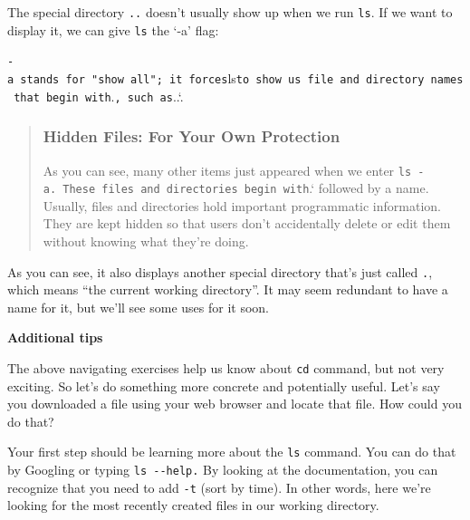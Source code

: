 \documentclass[
  letterpaper,
  DIV=11,
  numbers=noendperiod]{scrreprt}
\newenvironment{Shaded}{\begin{snugshade}}{\end{snugshade}}
\newcommand{\AttributeTok}[1]{\textcolor[rgb]{0.40,0.45,0.13}{#1}}
\newcommand{\BuiltInTok}[1]{\textcolor[rgb]{0.00,0.23,0.31}{#1}}
\newcommand{\ExtensionTok}[1]{\textcolor[rgb]{0.00,0.23,0.31}{#1}}
\newcommand{\NormalTok}[1]{\textcolor[rgb]{0.00,0.23,0.31}{#1}}
\begin{document}
The special directory \texttt{..} doesn't usually show up when we run
\texttt{ls}. If we want to display it, we can give \texttt{ls} the `-a'
flag:

\begin{Shaded}
\end{Shaded}

\texttt{-a\textquotesingle{}\ stands\ for\ "show\ all";\ it\ forces}ls\texttt{to\ show\ us\ file\ and\ directory\ names\ that\ begin\ with}.\texttt{,\ such\ as}..`.

\begin{quote}
\hypertarget{hidden-files-for-your-own-protection}{%
\subsubsection*{Hidden Files: For Your Own
Protection}\label{hidden-files-for-your-own-protection}}

As you can see, many other items just appeared when we enter
\texttt{ls\ -a\textquotesingle{}.\ These\ files\ and\ directories\ begin\ with}.`
followed by a name. Usually, files and directories hold important
programmatic information. They are kept hidden so that users don't
accidentally delete or edit them without knowing what they're doing.
\end{quote}

As you can see, it also displays another special directory that's just
called \texttt{.}, which means ``the current working directory''. It may
seem redundant to have a name for it, but we'll see some uses for it
soon.

\textbf{Additional tips}

The above navigating exercises help us know about \texttt{cd} command,
but not very exciting. So let's do something more concrete and
potentially useful. Let's say you downloaded a file using your web
browser and locate that file. How could you do that?

Your first step should be learning more about the \texttt{ls} command.
You can do that by Googling or typing \texttt{ls\ -\/-help.} By looking
at the documentation, you can recognize that you need to add \texttt{-t}
(sort by time). In other words, here we're looking for the most recently
created files in our working directory.
\end{document}
